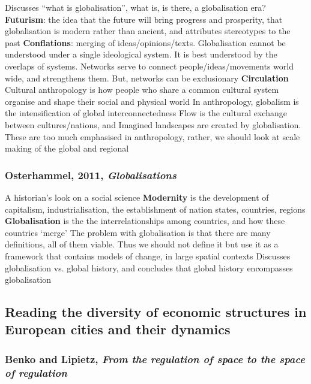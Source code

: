 \documentclass{article}
\begin{document}
\begin{outline}
	\1 Discusses ``what is globalisation'', what is, is there, a globalisation era?
	\1 \textbf{Futurism}: the idea that the future will bring progress and prosperity, that globalisation is modern rather than ancient, and attributes stereotypes to the past
	\1 \textbf{Conflations}: merging of ideas/opinions/texts. Globalisation cannot be understood under a single ideological system. It is best understood by the overlaps of systems. Networks serve to connect people/ideas/movements world wide, and strengthens them. But, networks can be exclusionary
	\1 \textbf{Circulation}
	\1 Cultural anthropology is how people who share a common cultural system organise and shape their social and physical world
	\1 In anthropology, globalism is the intensification of global interconnectedness
	\1 Flow is the cultural exchange between cultures/nations, and Imagined landscapes are created by globalisation. These are too much emphasised in anthropology, rather, we should look at scale making of the global and regional
\end{outline}

\subsubsection{Osterhammel, 2011, \textit{Globalisations}}


\begin{outline}
	\1 A historian's look on a social science
	\1 \textbf{Modernity} is the development of capitalism, industrialisation, the establishment of nation states, countries, regions
	\1 \textbf{Globalisation} is the the interrelationships among countries, and how these countries `merge'
	\1 The problem with globalisation is that there are many definitions, all of them viable. Thus we should not define it but use it as a framework that contains models of change, in large spatial contexts
	\1 Discusses globalisation vs. global history, and concludes that global history encompasses globalisation
\end{outline}

\subsection{Reading the diversity of economic structures in European cities and their dynamics}

\subsubsection{Benko and Lipietz, \textit{From the regulation of space to the space of regulation}}
\end{document}
